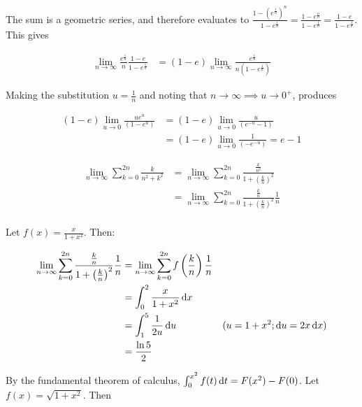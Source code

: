 The sum is a geometric series, and therefore evaluates to $\frac{1 - (e^{\frac{1}{n}})^{n}}{1 - e^{\frac{1}{n}}} = \frac{1 - e^{\frac{n}{n}}}{1 - e^{\frac{1}{n}}} = \frac{1 - e}{1 - e^{\frac{1}{n}}}$. This gives

\begin{align*}
  \lim_{n \longrightarrow \infty} \frac{e^{\frac{1}{n}}}{n} \frac{1 - e}{1 - e^{\frac{1}{n}}} &= (1 - e) \lim_{n \longrightarrow \infty} \frac{e^{\frac{1}{n}}}{n\left(1 - e^{\frac{1}{n}}\right)}
\end{align*}

Making the substitution $u = \frac{1}{n}$ and noting that $n \rightarrow \infty \implies u \rightarrow 0^{+}$, produces

\begin{align*}
  (1 - e) \lim_{u \longrightarrow 0} \frac{ue^u}{\left(1 - e^u\right)} &= (1 - e) \lim_{u \longrightarrow 0} \frac{u}{\left(e^{-u} - 1\right)} \\
  &= (1 - e) \lim_{u \longrightarrow 0} \frac{1}{\left(-e^{-u}\right)} = e - 1
\end{align*}


\begin{align*}
  \lim_{n \rightarrow \infty} \sum_{k = 0}^{2n} \frac{k}{n^2 + k^2} &= \lim_{n \rightarrow \infty} \sum_{k = 0}^{2n} \frac{\frac{k}{n^2}}{1 + \left(\frac{k}{n}\right)^2} \\
  &= \lim_{n \rightarrow \infty} \sum_{k = 0}^{2n} \frac{\frac{k}{n}}{1 + \left(\frac{k}{n}\right)^2} \frac{1}{n} \\
\end{align*}

Let $f(x) = \frac{x}{1 + x^2}$. Then:

\begin{align*}
  \lim_{n \rightarrow \infty} \sum_{k = 0}^{2n} \frac{\frac{k}{n}}{1 + \left(\frac{k}{n}\right)^2} \frac{1}{n} &= \lim_{n \rightarrow \infty} \sum_{k = 0}^{2n} f\left(\frac{k}{n}\right) \frac{1}{n} \\
  &= \int_0^2 \frac{x}{1 + x^2} \mathop{}\!\mathrm{d} x \\
  &= \int_1^5 \frac{1}{2u} \mathop{}\!\mathrm{d} u & (u = 1 + x^2; \mathop{}\!\mathrm{d} u = 2x \mathop{}\!\mathrm{d} x) \\
  &= \frac{\ln 5}{2}
\end{align*}


 By the fundamental theorem of calculus, $\int_0^{x^2} f(t) \mathop{}\!\mathrm{d} t = F(x^2) - F(0)$. Let $f(x) = \sqrt{1 + x^2}$. Then

